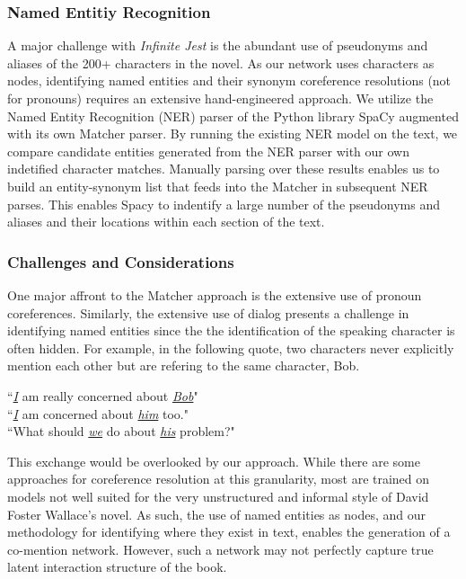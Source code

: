 \documentclass[12pt]{article}
\newcommand{\infinitejest}{{\em Infinite Jest}\xspace}
\begin{document}
\subsubsection*{Named Entitiy Recognition}

A major challenge with \infinitejest is the abundant use of pseudonyms and aliases of the 200+ characters in the novel. As our network uses characters as nodes, identifying named entities and their synonym coreference resolutions (not for pronouns) requires an extensive hand-engineered approach. We utilize the Named Entity Recognition (NER) parser of the Python library SpaCy \cite{spacy2} augmented with its own Matcher parser. By running the existing NER model on the text, we compare candidate entities generated from the NER parser with our own indetified character matches. Manually parsing over these results enables us to build an entity-synonym list that feeds into the Matcher in subsequent NER parses. This enables Spacy to indentify a large number of the pseudonyms and aliases and their locations within each section of the text.

\subsubsection*{Challenges and Considerations}
One major affront to the Matcher approach is the extensive use of pronoun coreferences. Similarly, the extensive use of dialog presents a challenge in identifying named entities since the the identification of the speaking character is often hidden. For example, in the following quote, two characters never explicitly mention each other but are refering to the same character, Bob.

\begin{displayquote}
``\emph{\underline{I}} am really concerned about \emph{\underline{Bob}}"\\
``\emph{\underline{I}} am concerned about \emph{\underline{him}} too."\\
``What should \underline{\emph{we}} do about \underline{\emph{his}} problem?"
\end{displayquote}

This exchange would be overlooked by our approach. While there are some approaches for coreference resolution at this granularity, most are trained on models not well suited for the very unstructured and informal style of David Foster Wallace's novel. As such, the use of named entities as nodes, and our methodology for identifying where they exist in text, enables the generation of a co-mention network. However, such a network may not perfectly capture true latent interaction structure of the book.
\end{document}

